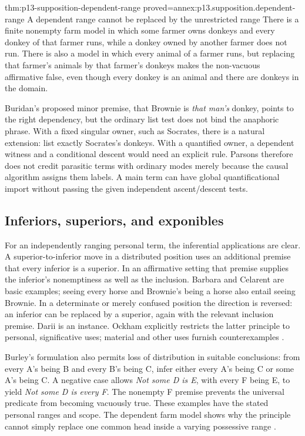 \begin{hbtheorem}{thm:p13-supposition-dependent-range}
 {proved=annex:p13.supposition.dependent-range}
 {A dependent range cannot be replaced by the unrestricted range}
There is a finite nonempty farm model in which some farmer owns
donkeys and every donkey of that farmer runs, while a donkey owned
by another farmer does not run. There is also a model in which every
animal of a farmer runs, but replacing that farmer's animals by that
farmer's donkeys makes the non-vacuous affirmative false, even though
every donkey is an animal and there are donkeys in the domain.
\end{hbtheorem}

Buridan's proposed minor premise, that Brownie is \emph{that man's}
donkey, points to the right dependency, but the ordinary list test does
not bind the anaphoric phrase. With a fixed singular owner, such as
Socrates, there is a natural extension: list exactly Socrates's donkeys.
With a quantified owner, a dependent witness and a conditional descent
would need an explicit rule. Parsons therefore does not credit parasitic
terms with ordinary modes merely because the causal algorithm assigns
them labels. A main term can have global quantificational import without
passing the given independent ascent/descent tests.

\subsection{Inferiors, superiors, and exponibles}
\label{sec:p13-supposition-monotonicity}

For an independently ranging personal term, the inferential applications
are clear. A superior-to-inferior move in a distributed position uses
an additional premise that every inferior is a superior. In an affirmative
setting that premise supplies the inferior's nonemptiness as well as
the inclusion. Barbara and Celarent are basic examples; seeing every
horse and Brownie's being a horse also entail seeing Brownie. In a
determinate or merely confused position the direction is reversed:
an inferior can be replaced by a superior, again with the relevant
inclusion premise. Darii is an instance. Ockham explicitly restricts
the latter principle to personal, significative uses; material and
other uses furnish counterexamples
\cite[pp.~256--258]{Parsons2007FordhamSupposition}.

Burley's formulation also permits loss of distribution in suitable
conclusions: from every A's being B and every B's being C, infer either
every A's being C or some A's being C. A negative case allows
\emph{Not some D is E}, with every F being E, to yield
\emph{Not some D is every F}. The nonempty F premise prevents the
universal predicate from becoming vacuously true. These examples have
the stated personal ranges and scope. The dependent farm model shows
why the principle cannot simply replace one common head inside a
varying possessive range
\cite[pp.~258--259]{Parsons2007FordhamSupposition}.

